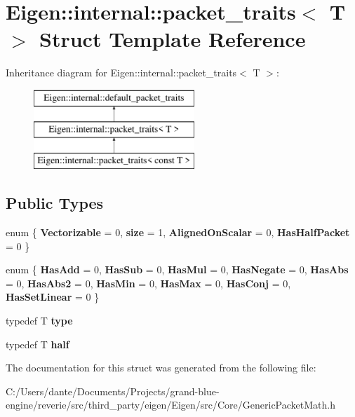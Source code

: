 \hypertarget{struct_eigen_1_1internal_1_1packet__traits}{}\section{Eigen\+::internal\+::packet\+\_\+traits$<$ T $>$ Struct Template Reference}
\label{struct_eigen_1_1internal_1_1packet__traits}
Inheritance diagram for Eigen\+::internal\+::packet\+\_\+traits$<$ T $>$\+:\begin{figure}[H]
\begin{center}
\leavevmode
\includegraphics[height=3.000000cm]{struct_eigen_1_1internal_1_1packet__traits}
\end{center}
\end{figure}
\subsection*{Public Types}
\begin{DoxyCompactItemize}
\item 
\mbox{\label{struct_eigen_1_1internal_1_1packet__traits_a5f8742b9af75bc0d15bb1dda8a0f873a}} 
enum \{ {\bfseries Vectorizable} = 0, 
{\bfseries size} = 1, 
{\bfseries Aligned\+On\+Scalar} = 0, 
{\bfseries Has\+Half\+Packet} = 0
 \}
\item 
\mbox{\label{struct_eigen_1_1internal_1_1packet__traits_a5921f0dc03861e109c25d70f9e8681d8}} 
enum \{ \newline
{\bfseries Has\+Add} = 0, 
{\bfseries Has\+Sub} = 0, 
{\bfseries Has\+Mul} = 0, 
{\bfseries Has\+Negate} = 0, 
\newline
{\bfseries Has\+Abs} = 0, 
{\bfseries Has\+Abs2} = 0, 
{\bfseries Has\+Min} = 0, 
{\bfseries Has\+Max} = 0, 
\newline
{\bfseries Has\+Conj} = 0, 
{\bfseries Has\+Set\+Linear} = 0
 \}
\item 
\mbox{\label{struct_eigen_1_1internal_1_1packet__traits_a811c5bde6641fd0f7a8f88be5e11ce27}} 
typedef T {\bfseries type}
\item 
\mbox{\label{struct_eigen_1_1internal_1_1packet__traits_ac40b1e8f231d7441d59389e5d10af31b}} 
typedef T {\bfseries half}
\end{DoxyCompactItemize}


The documentation for this struct was generated from the following file\+:\begin{DoxyCompactItemize}
\item 
C\+:/\+Users/dante/\+Documents/\+Projects/grand-\/blue-\/engine/reverie/src/third\+\_\+party/eigen/\+Eigen/src/\+Core/Generic\+Packet\+Math.\+h\end{DoxyCompactItemize}
